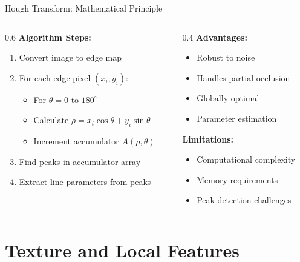 \documentclass[aspectratio=169,10pt]{beamer}
\begin{document}
\begin{frame}{Hough Transform: Mathematical Principle}
    \begin{columns}[c]
        \begin{column}{0.6\textwidth}
            \textbf{Algorithm Steps:}
            \begin{enumerate}
                \item Convert image to edge map
                \item For each edge pixel $(x_i, y_i)$:
                \begin{itemize}
                    \item For $\theta = 0$ to $180^\circ$
                    \item Calculate $\rho = x_i \cos\theta + y_i \sin\theta$
                    \item Increment accumulator $A(\rho, \theta)$
                \end{itemize}
                \item Find peaks in accumulator array
                \item Extract line parameters from peaks
            \end{enumerate}
        \end{column}
        \begin{column}{0.4\textwidth}
            \textbf{Advantages:}
            \begin{itemize}
                \item Robust to noise
                \item Handles partial occlusion
                \item Globally optimal
                \item Parameter estimation
            \end{itemize}

            \textbf{Limitations:}
            \begin{itemize}
                \item Computational complexity
                \item Memory requirements
                \item Peak detection challenges
            \end{itemize}
        \end{column}
    \end{columns}
\end{frame}

\section{Texture and Local Features}
\end{document}
